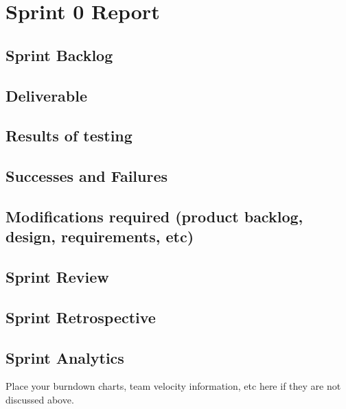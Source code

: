 
\section{Sprint 0 Report}
\subsection{Sprint Backlog}
\subsection{Deliverable}
\subsection{Results of testing}
\subsection{Successes and Failures}
\subsection{Modifications required (product backlog, design, requirements, etc)}
\subsection{Sprint Review}
\subsection{Sprint Retrospective}
\subsection{Sprint Analytics} 
Place your burndown charts, team velocity information, etc here if they are not discussed above.